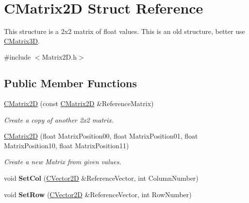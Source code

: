 \hypertarget{struct_c_matrix2_d}{}\section{C\+Matrix2D Struct Reference}
\label{struct_c_matrix2_d}


This structure is a 2x2 matrix of float values. This is an old structure, better use \hyperlink{struct_c_matrix3_d}{C\+Matrix3D}.  




{\ttfamily \#include $<$Matrix2\+D.\+h$>$}

\subsection*{Public Member Functions}
\begin{DoxyCompactItemize}
\item 
\hyperlink{struct_c_matrix2_d_a284beaa85a289a5a3bd14853fd583b0a}{C\+Matrix2D} (const \hyperlink{struct_c_matrix2_d}{C\+Matrix2D} \&Reference\+Matrix)\hypertarget{struct_c_matrix2_d_a284beaa85a289a5a3bd14853fd583b0a}{}\label{struct_c_matrix2_d_a284beaa85a289a5a3bd14853fd583b0a}

\begin{DoxyCompactList}\small\item\em Create a copy of another 2x2 matrix. \end{DoxyCompactList}\item 
\hyperlink{struct_c_matrix2_d_a7786e4eddbd0d1d98b1138751de40c4c}{C\+Matrix2D} (float Matrix\+Position00, float Matrix\+Position01, float Matrix\+Position10, float Matrix\+Position11)\hypertarget{struct_c_matrix2_d_a7786e4eddbd0d1d98b1138751de40c4c}{}\label{struct_c_matrix2_d_a7786e4eddbd0d1d98b1138751de40c4c}

\begin{DoxyCompactList}\small\item\em Create a new Matrix from given values. \end{DoxyCompactList}\item 
void {\bfseries Set\+Col} (\hyperlink{struct_c_vector2_d}{C\+Vector2D} \&Reference\+Vector, int Column\+Number)\hypertarget{struct_c_matrix2_d_a0b371d33c0d14659f43d4492c6de9a03}{}\label{struct_c_matrix2_d_a0b371d33c0d14659f43d4492c6de9a03}

\item 
void {\bfseries Set\+Row} (\hyperlink{struct_c_vector2_d}{C\+Vector2D} \&Reference\+Vector, int Row\+Number)\hypertarget{struct_c_matrix2_d_ae87843415b1cefd3eb126300d04f0ee5}{}\label{struct_c_matrix2_d_ae87843415b1cefd3eb126300d04f0ee5}


\end{DoxyCompactItemize}
